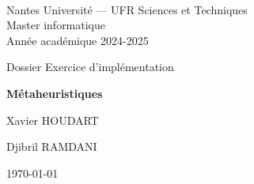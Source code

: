 \documentclass[a4paper,10pt]{article}
\begin{document}
~
\vspace{50mm}
{\large
\begin{center}
  Nantes Université --- UFR Sciences et Techniques\\
  Master informatique\\
  Année académique 2024-2025
  \vspace{30mm}
 
  { \LARGE
 
     Dossier Exercice d'implémentation\\
     \vspace{5mm}
 
     {\huge \textbf{Métaheuristiques}}
     \vspace{5mm}
 
     Xavier \textsc{HOUDART}%
     
     Djibril \textsc{RAMDANI}%
     \vspace{50mm}
  
     \today
  }  
\end{center}
}

\vfill
\break


 




\end{document}
